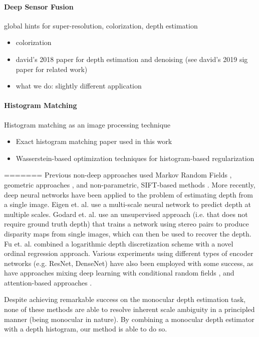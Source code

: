 \paragraph{Deep Sensor Fusion}

global hints for super-resolution, colorization, depth estimation 
%
\begin{itemize}
	\item colorization
	\item david's 2018 paper for depth estimation and denoising (see david's 2019 sig paper for related work)
	\item what we do: slightly different application
\end{itemize}

\paragraph{Histogram Matching}

Histogram matching as an image processing technique
%
\begin{itemize}
  \item Exact histogram matching paper used in this work
  \item Wasserstein-based optimization techniques for
    histogram-based regularization
\end{itemize}
=======
Previous non-deep approaches used Markov Random Fields \cite{Saxena2006},
geometric approaches \cite{Hoiem2005}, and non-parametric, SIFT-based methods
\cite{Karsch2014}.
More recently, deep neural networks have been applied to the problem of estimating depth from a
single image. Eigen et. al. \cite{Eigen2014} use a multi-scale neural network to
predict depth at multiple scales. Godard et. al. \cite{Godard2017} use an
unsupervised approach (i.e. that does not require ground truth depth) that
trains a network using stereo pairs to produce disparity maps from
single images, which can then be used to recover the depth. Fu et. al.
\cite{Fu2018} combined a logarithmic depth discretization scheme with a novel
ordinal regression approach. Various experiments using different types of
encoder networks (e.g. ResNet, DenseNet) \cite{Laina2016} \cite{Alhashim2018}
have also been employed with some success, as have approaches mixing deep
learning with conditional random fields \cite{Xu2017}, and attention-based
approaches \cite{Xu2018} \cite{Hao2018}.

Despite achieving remarkable success on the monocular depth estimation task, none of these methods are able to
resolve inherent scale ambiguity in a principled manner (being monocular in nature). By combining a monocular
depth estimator with a depth histogram, our method is able to do so.

